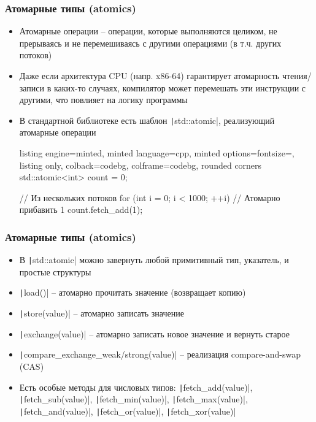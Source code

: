 \documentclass[10pt]{beamer}
\begin{document}
\begin{frame}[fragile]
\frametitle{Атомарные типы (atomics)}
\begin{itemize}
\item Атомарные операции -- операции, которые выполняются целиком, не прерываясь и не перемешиваясь с другими операциями (в т.ч. других потоков)
\pause
\item Даже если архитектура CPU (напр. x86-64) гарантирует атомарность чтения/записи в каких-то случаях, компилятор может перемешать эти инструкции с другими, что повлияет на логику программы
\pause
\item В стандартной библиотеке есть шаблон \texttt|std::atomic|, реализующий атомарные операции
\pause
{}
\begin{tcblisting}{listing engine=minted, minted language=cpp, minted options={fontsize=\scriptsize}, listing only, colback=codebg, colframe=codebg, rounded corners}
std::atomic<int> count = 0;

// Из нескольких потоков
for (int i = 0; i < 1000; ++i)
  // Атомарно прибавить 1
  count.fetch_add(1);
\end{tcblisting}
\end{itemize}
\end{frame}

\begin{frame}[fragile]
\frametitle{Атомарные типы (atomics)}
\begin{itemize}
\item В \texttt|std::atomic| можно завернуть любой примитивный тип, указатель, и простые структуры
\pause
\item \texttt|load()| -- атомарно прочитать значение (возвращает копию)
\pause
\item \texttt|store(value)| -- атомарно записать значение
\pause
\item \texttt|exchange(value)| -- атомарно записать новое значение и вернуть старое
\pause
\item \texttt|compare_exchange_weak/strong(value)| -- реализация compare-and-swap (CAS)
\pause
\item Есть особые методы для числовых типов: \texttt|fetch_add(value)|, \texttt|fetch_sub(value)|, \texttt|fetch_min(value)|, \texttt|fetch_max(value)|, \texttt|fetch_and(value)|, \texttt|fetch_or(value)|, \texttt|fetch_xor(value)|
\end{itemize}
\end{frame}
\end{document}
